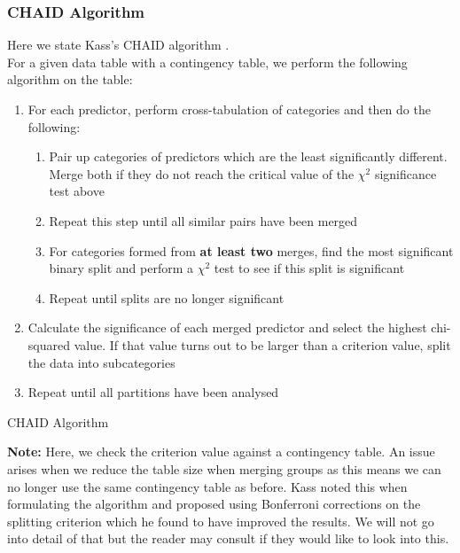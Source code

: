 \documentclass[11pt,a4paper]{report}
\begin{document}
\subsubsection{CHAID Algorithm}
Here we state Kass's CHAID algorithm \cite[pp. 121]{CHAID}.\\
For a given data table with a contingency table, we perform the following algorithm on the table:
\begin{algorithm}
\begin{enumerate}
    \item For each predictor, perform cross-tabulation of categories and then do the following:
    \begin{enumerate}
        \item Pair up categories of predictors which are the least significantly different. Merge both if they do not reach the critical value of the $\chi^{2}$ significance test above
        
        \item Repeat this step until all similar pairs have been merged
        
        \item For categories formed from \textbf{at least two} merges, find the most significant binary split and perform a $\chi^{2}$ test to see if this split is significant
        
        \item Repeat until splits are no longer significant
    \end{enumerate}
    
    \item Calculate the significance of each merged predictor and select the highest chi-squared value. If that value turns out to be larger than a criterion value, split the data into subcategories
    
    \item Repeat until all partitions have been analysed
\end{enumerate}
\caption{CHAID Algorithm}
\end{algorithm}

\textbf{Note:} Here, we check the criterion value against a contingency table.
An issue arises when we reduce the table size when merging groups as this means we can no longer use the same contingency table as before.
Kass noted this when formulating the algorithm and proposed using Bonferroni corrections on the splitting criterion which he found to have improved the results. 
We will not go into detail of that but the reader may consult \cite[pp. 122-126]{CHAID} if they would like to look into this.
\end{document}
